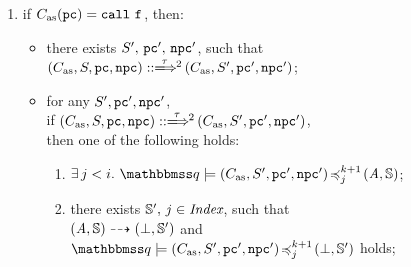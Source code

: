 \begin{definition}
\begin{enumerate}[1.]
        \item if $\asmimp(\pc) = \call \ \lab{}$, then:
            \begin{itemize}
                \item there exists $S', \, \texttt{pc}', \, \texttt{npc}'$,
                 such that \\
                    $\LGlobMultiTrans{(\asmimp, \state, \pc, \npc)}
                        {\empmsg\,}{2}{(\asmimp, \state', \pc', \npc')}$;
                \item for any $S', \texttt{pc}', \texttt{npc}'$, \\ if
                $\LGlobMultiTrans{(\asmimp, \state, \pc, \npc)}{\empmsg\,}
                    {2}{(\asmimp, \state', \pc', \npc')}$, \\
                    then one of the following holds:
                \begin{enumerate}
                    \item $\exists \, j < i. \
                        \simFunctionSt{\relastQ}{(\asmimp, \state', \pc', \npc')}
                            {j}{k+1}{(\primcom, \hpstate)}$;
                    \item there exists $\mathbb{S}', \, j \in \textit{Index}$,
                        such that \\
                        ${(\textit{A}, \mathbb{S})} \dashrightarrow {(\perp, \mathbb{S}')}$
                        and \\
                        $\simFunctionSt{\relastQ}{(\asmimp, \state', \pc', \npc')}
                            {j}{k+1}{(\primdone, \hpstate')}$ holds;
                \end{enumerate}
            \end{itemize}
            \vspace{0.5em}


\end{enumerate}
\end{definition}
